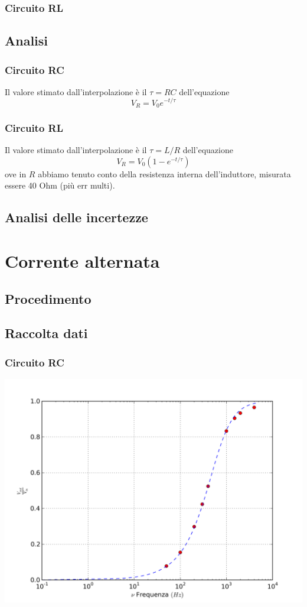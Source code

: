 \subsubsection{Circuito RL}

\subsection{Analisi}

\subsubsection{Circuito RC}

Il valore stimato dall'interpolazione è il $\tau=RC$ dell'equazione
$$V_R = V_0 e^{-t/\tau}$$

\subsubsection{Circuito RL}

Il valore stimato dall'interpolazione è il $\tau=L/R$ dell'equazione
$$V_R = V_0 (1-e^{-t/\tau})$$
ove in $R$ abbiamo tenuto conto della resistenza interna dell'induttore, misurata essere 40 Ohm (più err multi).


\subsection{Analisi delle incertezze}


\section{Corrente alternata}
\subsection{Procedimento}
\subsection{Raccolta dati}
\subsubsection{Circuito RC}
\begin{center}
 \includegraphics[scale=0.50]{grafici/C3/ddpcond.png}
\end{center}
